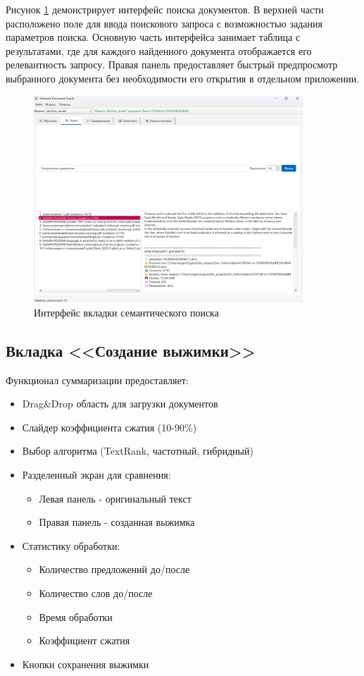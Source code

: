 Рисунок \ref{poisk} демонстрирует интерфейс поиска документов. В верхней части расположено поле для ввода поискового запроса с возможностью задания параметров поиска. Основную часть интерфейса занимает таблица с результатами, где для каждого найденного документа отображается его релевантность запросу. Правая панель предоставляет быстрый предпросмотр выбранного документа без необходимости его открытия в отдельном приложении.
\begin{figure}[H]
	\centering
	\includegraphics[width=0.9\textwidth]{images/poisk.png}
	\caption{Интерфейс вкладки семантического поиска}
	\label{poisk}
\end{figure}


\subsection{Вкладка <<Создание выжимки>>}

Функционал суммаризации предоставляет:
\begin{itemize}
	\item Drag\&Drop область для загрузки документов
	\item Слайдер коэффициента сжатия (10-90\%)
	\item Выбор алгоритма (TextRank, частотный, гибридный)
	\item Разделенный экран для сравнения:
	\begin{itemize}
		\item Левая панель - оригинальный текст
		\item Правая панель - созданная выжимка
	\end{itemize}
	\item Статистику обработки:
	\begin{itemize}
		\item Количество предложений до/после
		\item Количество слов до/после
		\item Время обработки
		\item Коэффициент сжатия
	\end{itemize}
	\item Кнопки сохранения выжимки
\end{itemize}

